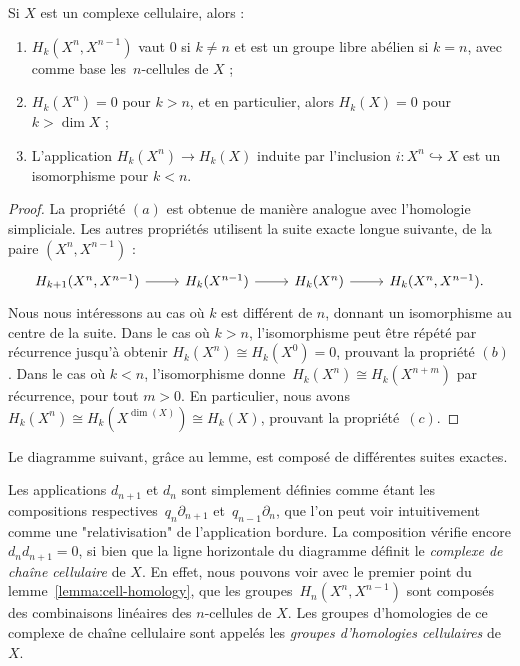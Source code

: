 \begin{lemma}\label{lemma:cell-homology}
Si $X$ est un complexe cellulaire, alors : \begin{enumerate}[label=(\alph*)]
    \item $H_k(X^n,X^{n-1})$ vaut 0 si $k\neq n$ et est un groupe libre abélien si $k=n$, avec comme base les~$n$-cellules de $X$ ;
    \item $H_k(X^n)=0$ pour $k>n$, et en particulier, alors $H_k(X)=0$ pour~$k>\dim X$ ;
    \item L'application $H_k(X^n)\to H_k(X)$ induite par l'inclusion $i:X^n\hookrightarrow X$ est un isomorphisme pour $k<n$.%
\end{enumerate}
\end{lemma}
\begin{proof}
La propriété $(a)$ est obtenue de manière analogue avec l'homologie simpliciale. Les autres propriétés utilisent la suite exacte longue suivante, de la paire $(X^n,X^{n-1})$ : \[\begin{tikzcd}
H_{k+1}(X^n,X^{n-1})\arrow[r]&H_k(X^{n-1})\arrow[r]&H_k(X^n)\arrow[r]&H_k(X^n,X^{n-1}).
\end{tikzcd}\]Nous nous intéressons au cas où $k$ est différent de $n$, donnant un isomorphisme au centre de la suite. Dans le cas où $k>n$, l'isomorphisme peut être répété par récurrence jusqu'à obtenir $H_k(X^n)\cong H_k(X^0)=0$, prouvant la propriété $(b)$. Dans le cas où $k<n$, l'isomorphisme donne~$H_k(X^n)\cong H_k(X^{n+m})$ par récurrence, pour tout $m>0$. En particulier, nous avons $H_k(X^n)\cong H_k(X^{\dim(X)})\cong H_k(X)$, prouvant la propriété~$(c)$.
\end{proof}

Le diagramme suivant, grâce au lemme, est composé de différentes suites exactes.

\scalebox{0.7}{

}


Les applications $d_{n+1}$ et $d_n$ sont simplement définies comme étant les compositions respectives~$q_n\partial_{n+1}$ et~$q_{n-1}\partial_n$, que l'on peut voir intuitivement comme une "relativisation" de l'application bordure. La composition vérifie encore $d_nd_{n+1}=0$, si bien que la ligne horizontale du diagramme définit le \emph{complexe de chaîne cellulaire} de $X$. En effet, nous pouvons voir avec le premier point du lemme~\ref{lemma:cell-homology}, que les groupes~$H_n(X^n,X^{n-1})$ sont composés des combinaisons linéaires des $n$-cellules de $X$. Les groupes d'homologies de ce complexe de chaîne cellulaire sont appelés les \emph{groupes d'homologies cellulaires} de $X$.

